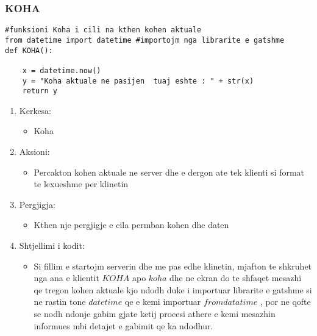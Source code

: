 \documentclass[]{article}
\begin{document}
\subsubsection{KOHA}
\begin{lstlisting}
#funksioni Koha i cili na kthen kohen aktuale
from datetime import datetime #importojm nga librarite e gatshme
def KOHA():
    
    x = datetime.now()
    y = "Koha aktuale ne pasijen  tuaj eshte : " + str(x)
    return y

\end{lstlisting}
\begin{enumerate}
\item Kerkesa:
\begin{itemize}
\item Koha
\end{itemize}
\item Aksioni:
\begin{itemize}
\item Percakton kohen aktuale ne server dhe e dergon ate tek klienti si format te lexueshme per klinetin
\end{itemize}
\item Pergjigja:
\begin{itemize}
\item Kthen nje pergjigje e cila permban kohen dhe daten
\end{itemize}
\item Shtjellimi i kodit:
\begin{itemize}
\item Si fillim e startojm serverin dhe me pas edhe klinetin, mjafton te shkruhet nga ana e klientit $KOHA$ apo $koha$ dhe ne ekran do te shfaqet  
mesazhi qe tregon kohen aktuale kjo ndodh duke i importuar librarite e gatshme si ne rastin tone $datetime$ qe e kemi importuar $from datatime$ 
, por ne qofte se nodh ndonje gabim gjate ketij procesi athere e kemi mesazhin informues mbi detajet e gabimit qe ka ndodhur.
\end{itemize}
\end{enumerate}
\newpage
\end{document}
